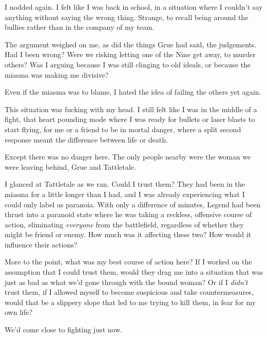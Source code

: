 I nodded again.  I felt like I was back in school, in a situation where I couldn't say anything without saying the wrong thing.  Strange, to recall being around the bullies rather than in the company of my team.



The argument weighed on me, as did the things Grue had said, the judgements.  Had I been wrong?  Were we risking letting one of the Nine get away, to murder others?  Was I arguing because I was still clinging to old ideals, or because the miasma was making me divisive?



Even if the miasma was to blame, I hated the idea of failing the others yet again.



This situation was fucking with my head.  I still felt like I was in the middle of a fight, that heart pounding mode where I was ready for bullets or laser blasts to start flying, for me or a friend to be in mortal danger, where a split second response meant the difference between life or death.



Except there was no danger here.  The only people nearby were the woman we were leaving behind, Grue and Tattletale.



I glanced at Tattletale as we ran.  Could I trust them?  They had been in the miasma for a little longer than I had, and I was already experiencing what I could only label as paranoia.  With only a difference of minutes, Legend had been thrust into a paranoid state where he was taking a reckless, offensive course of action, eliminating \emph{everyone} from the battlefield, regardless of whether they might be friend or enemy.  How much was it affecting these two?  How would it influence their actions?



More to the point, what was my best course of action here?  If I worked on the assumption that I could trust them, would they drag me into a situation that was just as bad as what we'd gone through with the bound woman?  Or if I \emph{didn't} trust them, if I allowed myself to become suspicious and take countermeasures, would that be a slippery slope that led to me trying to kill them, in fear for my own life?



We'd come close to fighting just now.




